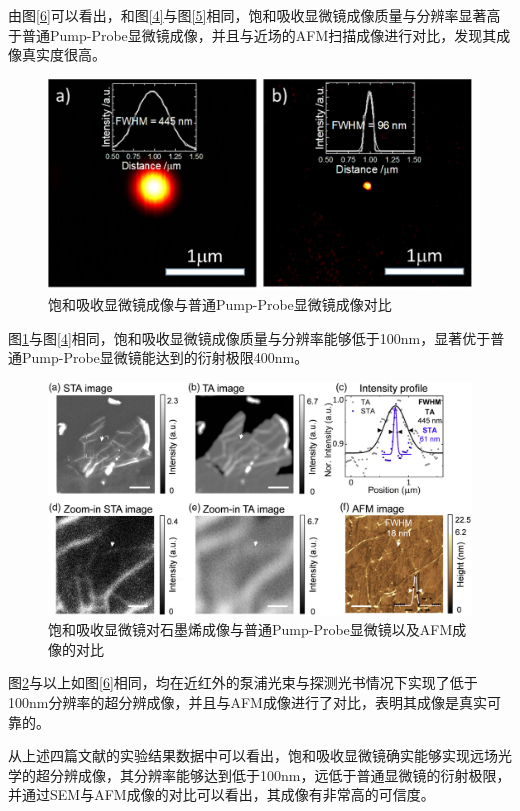 \documentclass{phyasgn}\usepackage{nag}
\begin{document}
    \par 由图\ref{6}可以看出，和图\ref{4}与图\ref{5}相同，饱和吸收显微镜成像质量与分辨率显著高于普通Pump-Probe显微镜成像，并且与近场的AFM扫描成像进行对比，发现其成像真实度很高。  
\begin{figure}[!h]
	\centering
	\includegraphics[width=.9\linewidth]{pic/7.png}
	\caption[饱和吸收显微镜原理]{饱和吸收显微镜成像与普通Pump-Probe显微镜成像对比\cite{doi:10.1021/acsphotonics.9b01821}}\vspace{1ex}
	\label{7}
	\end{figure}  
    \par 图\ref{7}与图\ref{4}相同，饱和吸收显微镜成像质量与分辨率能够低于100nm，显著优于普通Pump-Probe显微镜能达到的衍射极限400nm。
\begin{figure}[!h]
	\centering
	\includegraphics[width=.9\linewidth]{pic/8.png}
	\caption[饱和吸收显微镜原理]{饱和吸收显微镜对石墨烯成像与普通Pump-Probe显微镜以及AFM成像的对比\cite{Bi:20}}\vspace{1ex}
	\label{8}
	\end{figure} 
    \par 图\ref{8}与以上如图\ref{6}相同，均在近红外的泵浦光束与探测光书情况下实现了低于100nm分辨率的超分辨成像，并且与AFM成像进行了对比，表明其成像是真实可靠的。
    \par 从上述四篇文献的实验结果数据中可以看出，饱和吸收显微镜确实能够实现远场光学的超分辨成像，其分辨率能够达到低于100nm，远低于普通显微镜的衍射极限，并通过SEM与AFM成像的对比可以看出，其成像有非常高的可信度。
\end{document}
